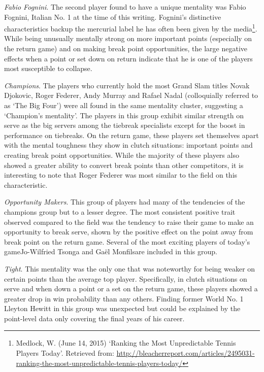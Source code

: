 \documentclass{Latex/svjour3}
\begin{document}
\textit{Fabio Fognini}. The second player found to have a unique mentality was
Fabio Fognini, Italian No. 1 at the time of this writing. Fognini's distinctive
characteristics backup the mercurial label he has often been given by the
media\footnote{Medlock, W. (June 14, 2015) `Ranking the Most Unpredictable
  Tennis Players Today'. Retrieved from:
  \url{http://bleacherreport.com/articles/2495031-ranking-the-most-unpredictable-tennis-players-today/}}. While
being unusually mentally strong on more important points (especially on the
return game) and on making break point opportunities, the large negative effects
when a point or set down on return indicate that he is one of the players most
susceptible to collapse.

\textit{Champions}. The players who currently hold the most Grand Slam titles
Novak Djokovic, Roger Federer, Andy Murray and Rafael Nadal (colloquially
referred to as `The Big Four') were all found in the same mentality cluster,
suggesting a `Champion's mentality'. The players in this group exhibit similar
strength on serve as the big servers among the tiebreak specialists except for
the boost in performance on tiebreaks. On the return game, these players set
themselves apart with the mental toughness they show in clutch situations:
important points and creating break point opportunities. While the majority of
these players also showed a greater ability to convert break points than other
competitors, it is interesting to note that Roger Federer was most similar to
the field on this characteristic.

\textit{Opportunity Makers}. This group of players had many of the tendencies of
the champions group but to a lesser degree. The most consistent positive trait
observed compared to the field was the tendency to raise their game to make an
opportunity to break serve, shown by the positive effect on the point away from
break point on the return game. Several of the most exciting players of today's
game\textemdash Jo-Wilfried Tsonga and Ga\"{e}l Monfils\textemdash are included
in this group. 

\textit{Tight}. This mentality was the only one that was noteworthy for being
weaker on certain points than the average top player. Specifically, in clutch
situations on serve and when down a point or a set on the return game, these
players showed a greater drop in win probability than any others. Finding former
World No. 1 Lleyton Hewitt in this group was unexpected but could be explained
by the point-level data only covering the final years of his
career. 
\end{document}
